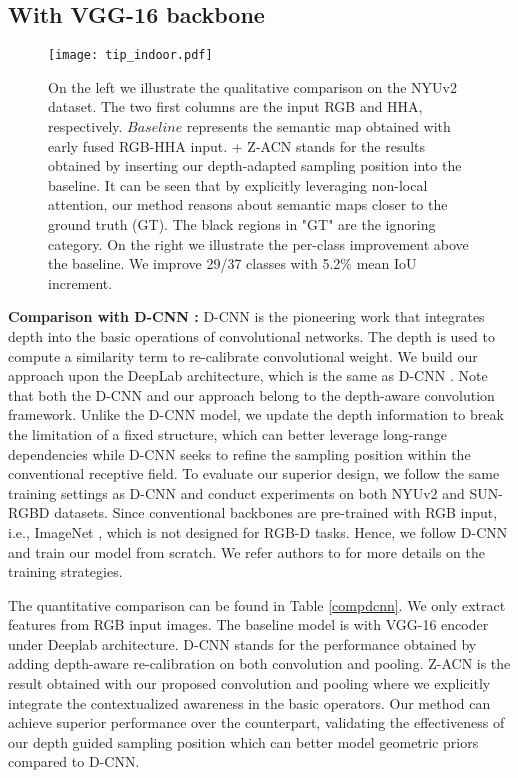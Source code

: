 \documentclass[lettersize,journal]{IEEEtran}
\begin{document}
\subsection{With VGG-16 backbone}
\begin{figure*}
\centering
\texttt{[image: tip\_indoor.pdf]}
\caption{On the left we illustrate the qualitative comparison on the NYUv2 dataset. The two first columns are the input RGB and HHA, respectively. $Baseline$ represents the semantic map obtained with early fused RGB-HHA input. + Z-ACN stands for the results obtained by inserting our depth-adapted sampling position into the baseline. It can be seen that by explicitly leveraging non-local attention, our method reasons about semantic maps closer to the ground truth (GT). The black regions in "GT" are the ignoring category. On the right we illustrate the per-class improvement above the baseline. We improve 29/37 classes with 5.2\% mean IoU increment.}
\label{fig:nyu}
\end{figure*}

\textbf{Comparison with D-CNN \cite{Wang2018DCNN}:} D-CNN is the pioneering work that integrates depth into the basic operations of convolutional networks. The depth is used to compute a similarity term to re-calibrate convolutional weight. We build our approach upon the DeepLab architecture, which is the same as D-CNN \cite{Wang2018DCNN}. Note that both the D-CNN and our approach belong to the depth-aware convolution framework. Unlike the D-CNN model, we update the depth information to break the limitation of a fixed structure, which can better leverage long-range dependencies while D-CNN seeks to refine the sampling position within the conventional receptive field. To evaluate our superior design, we follow the same training settings as D-CNN and conduct experiments on both NYUv2 and SUN-RGBD datasets. Since conventional backbones are pre-trained with RGB input, i.e., ImageNet \cite{imagenet}, which is not designed for RGB-D tasks. Hence, we follow D-CNN and train our model from scratch. We refer authors to \cite{Wang2018DCNN} for more details on the training strategies.

The quantitative comparison can be found in Table \ref{compdcnn}. We only extract features from RGB input images. The baseline model is with VGG-16 encoder under Deeplab \cite{chen2017deeplab} architecture. D-CNN stands for the performance obtained by adding depth-aware re-calibration on both convolution and pooling. Z-ACN is the result obtained with our proposed convolution and pooling where we explicitly integrate the contextualized awareness in the basic operators. Our method can achieve superior performance over the counterpart, validating the effectiveness of our depth guided sampling position which can better model geometric priors compared to D-CNN.
\end{document}
